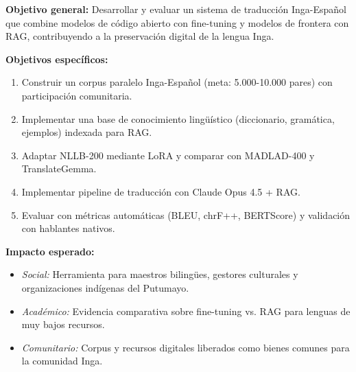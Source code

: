 \documentclass[11pt,a4paper]{article}
\begin{document}
\begin{campo}
\textbf{Objetivo general:} Desarrollar y evaluar un sistema de traducción Inga-Español que combine modelos de código abierto con fine-tuning y modelos de frontera con RAG, contribuyendo a la preservación digital de la lengua Inga.

\textbf{Objetivos específicos:}
\begin{enumerate}[nosep,leftmargin=*]
    \item Construir un corpus paralelo Inga-Español (meta: 5.000-10.000 pares) con participación comunitaria.
    \item Implementar una base de conocimiento lingüístico (diccionario, gramática, ejemplos) indexada para RAG.
    \item Adaptar NLLB-200 mediante LoRA y comparar con MADLAD-400 y TranslateGemma.
    \item Implementar pipeline de traducción con Claude Opus 4.5 + RAG.
    \item Evaluar con métricas automáticas (BLEU, chrF++, BERTScore) y validación con hablantes nativos.
\end{enumerate}

\textbf{Impacto esperado:}
\begin{itemize}[nosep,leftmargin=*]
    \item \textit{Social:} Herramienta para maestros bilingües, gestores culturales y organizaciones indígenas del Putumayo.
    \item \textit{Académico:} Evidencia comparativa sobre fine-tuning vs. RAG para lenguas de muy bajos recursos.
    \item \textit{Comunitario:} Corpus y recursos digitales liberados como bienes comunes para la comunidad Inga.
\end{itemize}
\end{campo}

\vspace{0.5cm}
\end{document}

